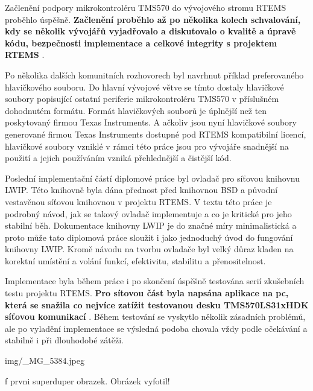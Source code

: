 Začlenění podpory mikrokontroléru TMS570 do vývojového stromu RTEMS proběhlo úspěšně.
{\bf Začlenění proběhlo až po několika kolech schvalování, kdy se několik vývojářů vyjadřovalo a diskutovalo o kvalitě a úpravě kódu, bezpečnosti implementace a celkové integrity s projektem RTEMS }.

Po několika dalších komunitních rozhovorech byl navrhnut příklad preferovaného hlavičkového souboru.
Do hlavní vývojové větve se tímto dostaly hlavičkové soubory popisující ostatní periferie mikrokontroléru TMS570 v příslušném dohodnutém formátu.
Formát hlavičkových souborů je úplnější než ten poskytovaný firmou Texas Instruments.
A ačkoliv jsou nyní hlavičkové soubory generované firmou Texas Instruments dostupné pod RTEMS kompatibilní licencí, hlavičkové soubory vzniklé v rámci této práce jsou pro vývojáře snadnější na použití a jejich používáním vzniká přehlednější a čistější kód. 

Poslední implementační částí diplomové práce byl ovladač pro síťovou knihovnu LWIP.
Této knihovně byla dána přednost před knihovnou BSD a původní vestavěnou síťovou knihovnou v projektu RTEMS.
V textu této práce je podrobný návod, jak se takový ovladač implementuje a co je kritické pro jeho stabilní běh.
Dokumentace knihovny LWIP je do značné míry minimalistická a proto může tato diplomová práce sloužit i jako jednoduchý úvod do fungování knihovny LWIP.
Kromě návodu na tvorbu ovladače byl velký důraz kladen na korektní umístění a volání funkcí, efektivitu, stabilitu a přenositelnost.

Implementace byla během práce i po skončení úspěšně testována serií zkušebních testu projektu RTEMS.
{\bf Pro sítovou část byla napsána aplikace na pc, která se snažila co nejvíce zatížit testovanou desku TMS570LS31xHDK síťovou komunikací }.
Během testování se vyskytlo několik zásadních problémů, ale po vyladění implementace se výsledná podoba chovala vždy podle očekávání a stabilně i při dlouhodobé zátěži.



\medskip
{}
\picw=13cm \cinspic img/_MG_5384.jpeg
\caption/f prvni superduper obrazek. Obrázek vyfotil!
\medskip

\bye
\grid
